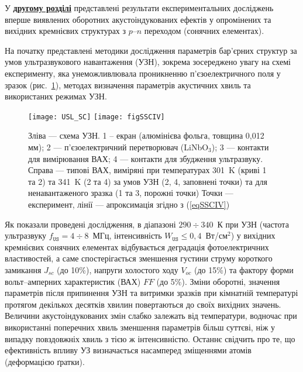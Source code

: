 У  \underline{\textbf{другому розділі}} представлені результати експериментальних досліджень вперше виявлених оборотних акустоіндукованих ефектів у опромінених та вихідних кремнієвих структурах з  $p$--$n$ переходом (сонячних елементах).

На початку представлені методики дослідження параметрів бар'єрних структур за умов ультразвукового навантаження (УЗН),
зокрема зосереджено увагу на схемі експерименту, яка унеможливлювала проникненню п'єзоелектричного поля у зразок (рис.~\ref{USL_SC}), методах визначення параметрів акустичних хвиль та використаних режимах УЗН.


\begin{figure}[b]
\center
\texttt{[image: USL\_SC]} \hfill
\texttt{[image: figSSCIV]}
\caption{\label{USL_SC}
Зліва --- схема УЗН.
1 --  екран (алюмінієва фольга, товщина 0,012 мм);
2 --- п'єзоелектричний перетворювач (LiNbO$_3$);
3 --- контакти для вимірювання ВАХ;
4 --- контакти для збудження ультразвуку.
Справа --- типові ВАХ, виміряні при температурах 301~K (криві 1 та 2) та 341~K (2 та 4)
за умов УЗН (2, 4, заповнені точки) та для ненавантаженого зразка (1 та 3, порожні точки)
Точки --- експеримент, лінії --- апроксимація згідно з (\ref{eqSSCIV})
}%
\end{figure}

 Як показали проведені дослідження,
   в діапазоні $290\div340$~К при УЗН (частота ультразвуку $f_\mathtt{US}=4\div8$~МГц, інтенсивність $W_\mathtt{US}\leq0,4$~Вт/см$^2$) у вихідних кремнієвих сонячних елементах  відбувається деградація
фотоелектричних властивостей, а саме
спостерігається зменшення густини струму короткого замикання $J_{sc}$ (до 10\%), напруги холостого ходу $V_{oc}$ (до 15\%) та фактору форми вольт--амперних характеристик (ВАХ) $F\!F$ (до 5\%).
Зміни оборотні, значення параметрів  після припинення УЗН  та витримки зразків при кімнатній температурі протягом декількох десятків хвилин повертаються до своїх вихідних значень.
Величини акустоіндукованих змін слабко залежать від температури, водночас при використанні поперечних хвиль зменшення параметрів більш суттєві, ніж у випадку повздовжніх хвиль з тією ж інтенсивністю.
Останнє свідчить про те, що ефективність впливу УЗ визначається насамперед зміщеннями атомів (деформацією ґратки).

